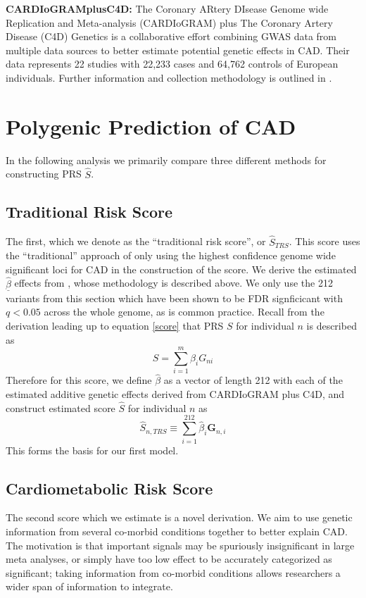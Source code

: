 \textbf{CARDIoGRAMplusC4D:} The Coronary ARtery DIsease Genome wide Replication and Meta-analysis (CARDIoGRAM) plus The Coronary Artery Disease (C4D) Genetics is a collaborative effort combining \ac{GWAS} data from multiple data sources to better estimate potential genetic effects in \ac{CAD}. Their data represents 22 studies with 22,233 cases and 64,762 controls of European individuals. Further information and collection methodology is outlined in \cite{TheCARDIoGRAMplusC4DConsortium2015}.


\section{Polygenic Prediction of CAD}

In the following analysis we primarily compare three different methods for constructing \ac{PRS} $\hat{S}$.

\subsection{Traditional Risk Score}

The first, which we denote as the ``traditional risk score'', or $\hat{S}_{TRS}$. This score uses the ``traditional'' approach of only using the highest confidence genome wide significant loci for \ac{CAD} in the construction of the score. We derive the estimated $\underline{\hat{\beta}}$ effects from \citep{TheCARDIoGRAMplusC4DConsortium2015}, whose methodology is described above. We only use the 212 variants from this section which have been shown to be FDR signficicant with $q < 0.05$ across the whole genome, as is common practice. Recall from the derivation leading up to equation \ref{score} that \ac{PRS} $S$ for individual $n$ is described as  $$ S = \sum^m_{i=1} \beta_i G_{ni} $$ Therefore for this score, we define $\hat{\beta}$ as a vector of length 212 with each of the estimated additive genetic effects derived from CARDIoGRAM plus C4D, and construct estimated score $\hat{S}$ for individual $n$ as $$ \hat{S}_{n, TRS} \equiv \sum^{212}_{i = 1} \hat{\beta}_i \mathbf{G}_{n, i} $$ This forms the basis for our first model.

\subsection{Cardiometabolic Risk Score}
\label{cmb-rs}

The second score which we estimate is a novel derivation. We aim to use genetic information from several co-morbid conditions together to better explain \ac{CAD}. The motivation is that important signals may be spuriously insignificant in large meta analyses, or simply have too low effect to be accurately categorized as significant; taking information from co-morbid conditions allows researchers a wider span of information to integrate. 

